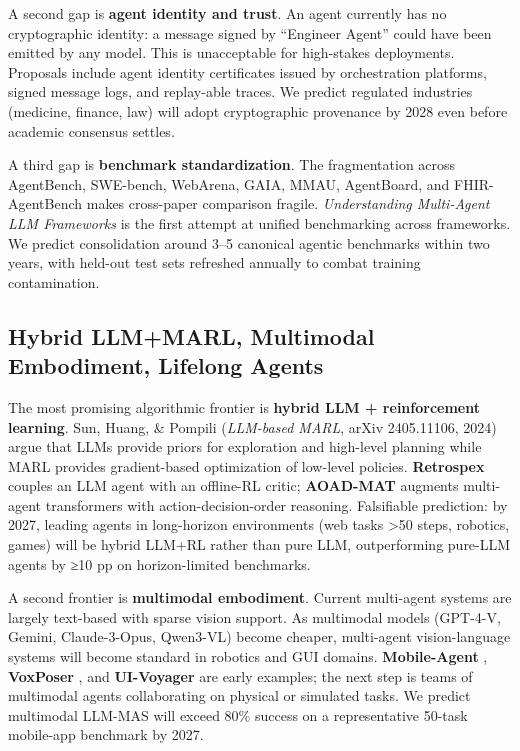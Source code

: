 \documentclass{article}
\begin{document}
A second gap is \textbf{agent identity and trust}. An agent currently has no cryptographic identity: a message signed by ``Engineer Agent'' could have been emitted by any model. This is unacceptable for high-stakes deployments. Proposals include agent identity certificates issued by orchestration platforms, signed message logs, and replay-able traces. We predict regulated industries (medicine, finance, law) will adopt cryptographic provenance by 2028 even before academic consensus settles.

A third gap is \textbf{benchmark standardization}. The fragmentation across AgentBench, SWE-bench, WebArena, GAIA, MMAU, AgentBoard, and FHIR-AgentBench makes cross-paper comparison fragile. \emph{Understanding Multi-Agent LLM Frameworks} \citep{orogat2026understandingmulti} is the first attempt at unified benchmarking across frameworks. We predict consolidation around 3--5 canonical agentic benchmarks within two years, with held-out test sets refreshed annually to combat training contamination.

\subsection{Hybrid LLM+MARL, Multimodal Embodiment, Lifelong Agents}\label{hybrid-llmmarl-multimodal-embodiment-lifelong-agents}

The most promising algorithmic frontier is \textbf{hybrid LLM + reinforcement learning}. Sun, Huang, \& Pompili (\emph{LLM-based MARL}, arXiv 2405.11106, 2024) argue that LLMs provide priors for exploration and high-level planning while MARL provides gradient-based optimization of low-level policies. \textbf{Retrospex} \citep{xiang20252025} couples an LLM agent with an offline-RL critic; \textbf{AOAD-MAT} \citep{takayama2025aoadmattransformer} augments multi-agent transformers with action-decision-order reasoning. Falsifiable prediction: by 2027, leading agents in long-horizon environments (web tasks \textgreater50 steps, robotics, games) will be hybrid LLM+RL rather than pure LLM, outperforming pure-LLM agents by ≥10 pp on horizon-limited benchmarks.

A second frontier is \textbf{multimodal embodiment}. Current multi-agent systems are largely text-based with sparse vision support. As multimodal models (GPT-4-V, Gemini, Claude-3-Opus, Qwen3-VL) become cheaper, multi-agent vision-language systems will become standard in robotics and GUI domains. \textbf{Mobile-Agent} \citep{wang20242024}, \textbf{VoxPoser} \citep{huang2023agentcodermultiage}, and \textbf{UI-Voyager} \citep{lin20262026} are early examples; the next step is teams of multimodal agents collaborating on physical or simulated tasks. We predict multimodal LLM-MAS will exceed 80\% success on a representative 50-task mobile-app benchmark by 2027.
\end{document}
